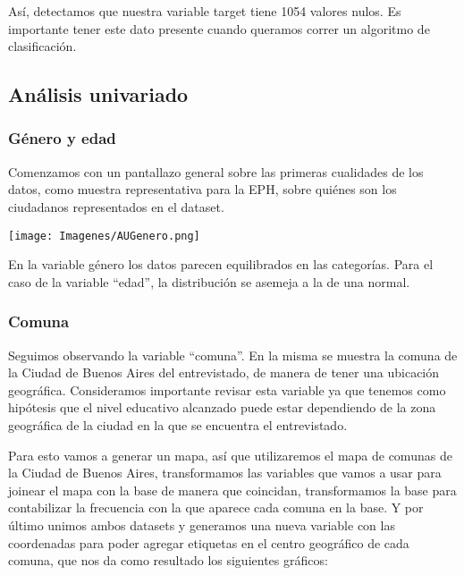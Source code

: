 \documentclass[a4paper]{article}
\begin{document}
    Así, detectamos que nuestra variable target tiene 1054 valores nulos. Es importante tener este dato presente cuando queramos correr un algoritmo de clasificación.
 
    \subsection{Análisis univariado}
 
        \subsubsection{Género y edad}
           
            Comenzamos con un pantallazo general sobre las primeras cualidades de los datos, como muestra representativa para la EPH, sobre quiénes son los ciudadanos representados en el dataset.
           
            \begin{center}
                \texttt{[image: Imagenes/AUGenero.png]}    
            \end{center}
           
 
            En la variable género los datos parecen equilibrados en las categorías. Para el caso de la variable ``edad'', la distribución se asemeja a la de una normal.
           
            \subsubsection{Comuna}
           
            Seguimos observando la variable ``comuna''. En la misma se muestra la comuna de la Ciudad de Buenos Aires del entrevistado, de manera de tener una ubicación geográfica. Consideramos importante revisar esta variable ya que tenemos como hipótesis que el nivel educativo alcanzado puede estar dependiendo de la zona geográfica de la ciudad en la que se encuentra el entrevistado.
           
            Para esto vamos a generar un mapa, así que utilizaremos el mapa de comunas de la Ciudad de Buenos Aires, transformamos las variables que vamos a usar para joinear el mapa con la base de manera que coincidan, transformamos la base para contabilizar la frecuencia con la que aparece cada comuna en la base. Y por último unimos ambos datasets y generamos una nueva variable con las coordenadas para poder agregar etiquetas en el centro geográfico de cada comuna, que nos da como resultado los siguientes gráficos:
           
\end{document}
